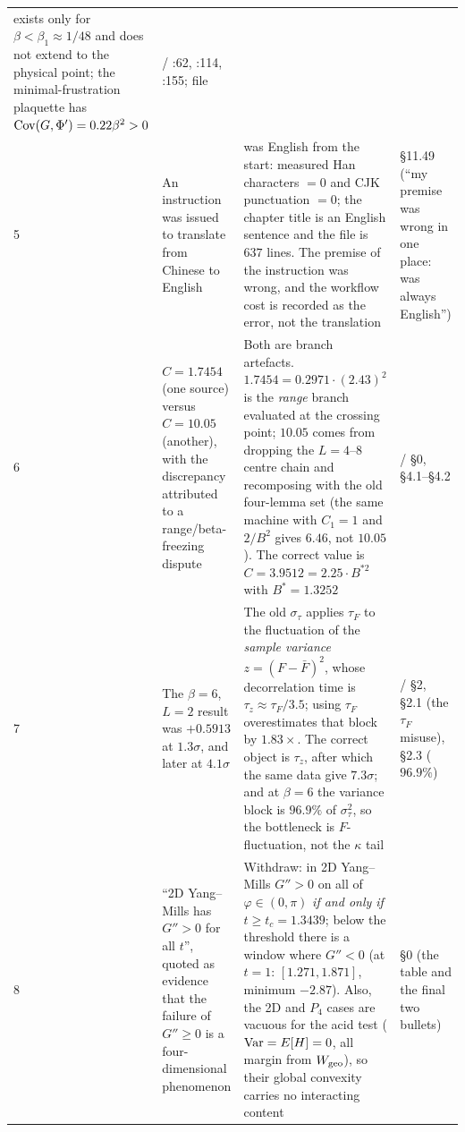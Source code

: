 {\begin{longtable}{@{}L{0.4cm}L{3.7cm}L{6.3cm}L{3.9cm}@{}}
    exists only for $\beta<\beta_1\approx1/48$ and does not extend to the physical point; the
    minimal-frustration plaquette has $\operatorname{Cov}(G,\Phi')=0.22\beta^{2}>0$
  & \LN{}/\LE{} :62, :114, :155; file  \\
5 & An instruction was issued to translate  from Chinese to English
  &  was English from the start: measured Han characters $=0$ and CJK punctuation
    $=0$; the chapter title is an English sentence and the file is $637$ lines. The premise of the
    instruction was wrong, and the workflow cost is recorded as the error, not the translation
  & \LE{}  \S11.49 (``my premise was wrong in one place:  was always
    English'') \\
6 & $C=1.7454$ \LT{} (one source) versus $C=10.05$ (another), with the discrepancy attributed to a
    range/beta-freezing dispute
  & Both are branch artefacts. $1.7454=0.2971\cdot(2.43)^{2}$ is the \emph{range} branch evaluated
    at the crossing point; $10.05$ comes from dropping the $L=4$--$8$ centre chain and
    recomposing with the old four-lemma set (the same machine with $C_1=1$ and $2/B^{2}$ gives
    $6.46$, not $10.05$). The correct value is $C=3.9512=2.25\cdot B^{*2}$ with $B^{*}=1.3252$
  & \LT{}/\LC{}  \S0, \S4.1--\S4.2 \\
7 & The $\beta=6$, $L=2$ result was $+0.5913$ at $1.3\sigma$, and later at $4.1\sigma$
  & The old $\sigma_\tau$ applies $\tau_F$ to the fluctuation of the \emph{sample variance}
    $z=(F-\bar F)^{2}$, whose decorrelation time is $\tau_z\approx\tau_F/3.5$; using $\tau_F$
    overestimates that block by $1.83\times$. The correct object is $\tau_z$, after which the same
    data give $7.3\sigma$; and at $\beta=6$ the variance block is $96.9\%$ of $\sigma^{2}_{\tau}$,
    so the bottleneck is $F$-fluctuation, not the $\kappa$ tail
  & \LT{}/\LE{}  \S2, \S2.1 (the $\tau_F$ misuse), \S2.3 ($96.9\%$) \\
8 & ``2D Yang--Mills has $G''>0$ for all $t$'', quoted as evidence that the failure of $G''\ge0$
    is a four-dimensional phenomenon
  & Withdraw: in 2D Yang--Mills $G''>0$ on all of $\varphi\in(0,\pi)$ \emph{if and only if}
    $t\ge t_c=1.3439$; below the threshold there is a window where $G''<0$ (at $t=1$:
    $[1.271,1.871]$, minimum $-2.87$). Also, the 2D and $P_4$ cases are vacuous for the acid test
    ($\operatorname{Var}=E[H]=0$, all margin from $W_{\mathrm{geo}}$), so their global convexity carries no interacting
    content
  & \LE{}  \S0 (the table and the final two bullets) \\
\bottomrule
\end{longtable}
}


